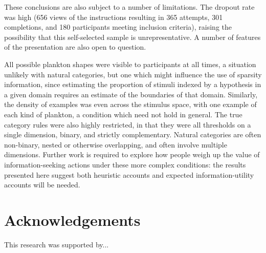 \documentclass[10pt,letterpaper]{article}
\begin{document}
These conclusions are also subject to a number of limitations. The dropout rate was high (656 views of the instructions resulting in 365 attempts, 301 completions, and 180 participants meeting inclusion criteria), raising the possibility that this self-selected sample is unrepresentative. A number of features of the presentation are also open to question.

All possible plankton shapes were visible to participants at all times, a situation unlikely with natural categories, but one which might influence the use of sparsity information, since estimating the proportion of stimuli indexed by a hypothesis in a given domain requires an estimate of the boundaries of that domain. Similarly, the density of examples was even across the stimulus space, with one example of each kind of plankton, a condition which need not hold in general. The true category rules were also highly restricted, in that they were all thresholds on a single dimension, binary, and strictly complementary. Natural categories are often non-binary, nested or otherwise overlapping, and often involve multiple dimensions. Further work is required to explore how people weigh up the value of information-seeking actions under these more complex conditions: the results presented here suggest both heuristic accounts and expected information-utility accounts will be needed.


\section{Acknowledgements}

This research was supported by... 

\renewcommand{\bibliographytypesize}{\footnotesize}


\setlength{\bibleftmargin}{.125in}
\setlength{\bibindent}{-\bibleftmargin}



\end{document}
